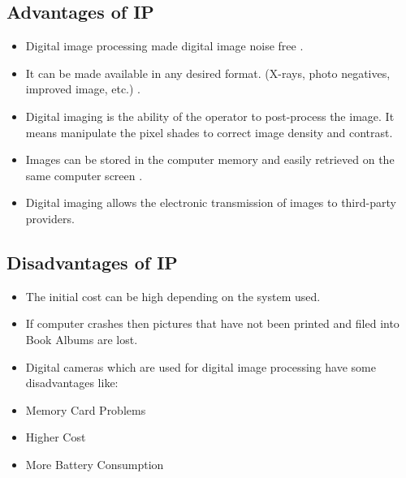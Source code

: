 \documentclass{article}
\begin{document}
\begin{multicols}{2}
        \subsection{Advantages of IP}
            \begin{itemize}
                \item Digital image processing made digital image noise free .
                \item It can be made available in any desired format. (X-rays, photo negatives, improved image, etc.) .
                \item Digital imaging is the ability of the operator to post-process the image. It means manipulate the pixel shades to correct image density and contrast.
                \item Images can be stored in the computer memory and easily retrieved on the same computer screen . 
                \item Digital imaging allows the electronic transmission of images to third-party providers. 
            \end{itemize}
        \subsection{Disadvantages of IP}
            \begin{itemize}
                \item The initial cost can be high depending on the system used.
                \item If computer crashes then pictures that have not been printed and filed into Book Albums are lost. 
                \item Digital cameras which are used for digital image processing have some disadvantages like: 

                \item Memory Card Problems 
                \item Higher Cost 
                \item More Battery Consumption 
            \end{itemize}
    \end{multicols}
\end{document}

